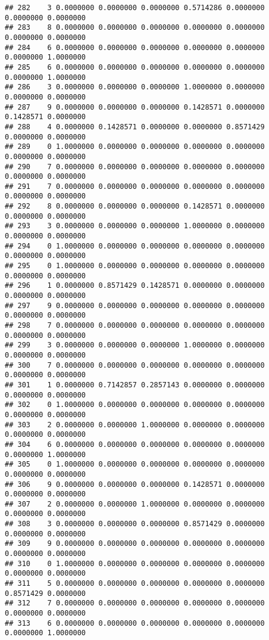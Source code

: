 \documentclass[
]{article}
\begin{document}
\begin{verbatim}
## 282    3 0.0000000 0.0000000 0.0000000 0.5714286 0.0000000 0.0000000 0.0000000
## 283    8 0.0000000 0.0000000 0.0000000 0.0000000 0.0000000 0.0000000 0.0000000
## 284    6 0.0000000 0.0000000 0.0000000 0.0000000 0.0000000 0.0000000 1.0000000
## 285    6 0.0000000 0.0000000 0.0000000 0.0000000 0.0000000 0.0000000 1.0000000
## 286    3 0.0000000 0.0000000 0.0000000 1.0000000 0.0000000 0.0000000 0.0000000
## 287    9 0.0000000 0.0000000 0.0000000 0.1428571 0.0000000 0.1428571 0.0000000
## 288    4 0.0000000 0.1428571 0.0000000 0.0000000 0.8571429 0.0000000 0.0000000
## 289    0 1.0000000 0.0000000 0.0000000 0.0000000 0.0000000 0.0000000 0.0000000
## 290    7 0.0000000 0.0000000 0.0000000 0.0000000 0.0000000 0.0000000 0.0000000
## 291    7 0.0000000 0.0000000 0.0000000 0.0000000 0.0000000 0.0000000 0.0000000
## 292    8 0.0000000 0.0000000 0.0000000 0.1428571 0.0000000 0.0000000 0.0000000
## 293    3 0.0000000 0.0000000 0.0000000 1.0000000 0.0000000 0.0000000 0.0000000
## 294    0 1.0000000 0.0000000 0.0000000 0.0000000 0.0000000 0.0000000 0.0000000
## 295    0 1.0000000 0.0000000 0.0000000 0.0000000 0.0000000 0.0000000 0.0000000
## 296    1 0.0000000 0.8571429 0.1428571 0.0000000 0.0000000 0.0000000 0.0000000
## 297    9 0.0000000 0.0000000 0.0000000 0.0000000 0.0000000 0.0000000 0.0000000
## 298    7 0.0000000 0.0000000 0.0000000 0.0000000 0.0000000 0.0000000 0.0000000
## 299    3 0.0000000 0.0000000 0.0000000 1.0000000 0.0000000 0.0000000 0.0000000
## 300    7 0.0000000 0.0000000 0.0000000 0.0000000 0.0000000 0.0000000 0.0000000
## 301    1 0.0000000 0.7142857 0.2857143 0.0000000 0.0000000 0.0000000 0.0000000
## 302    0 1.0000000 0.0000000 0.0000000 0.0000000 0.0000000 0.0000000 0.0000000
## 303    2 0.0000000 0.0000000 1.0000000 0.0000000 0.0000000 0.0000000 0.0000000
## 304    6 0.0000000 0.0000000 0.0000000 0.0000000 0.0000000 0.0000000 1.0000000
## 305    0 1.0000000 0.0000000 0.0000000 0.0000000 0.0000000 0.0000000 0.0000000
## 306    9 0.0000000 0.0000000 0.0000000 0.1428571 0.0000000 0.0000000 0.0000000
## 307    2 0.0000000 0.0000000 1.0000000 0.0000000 0.0000000 0.0000000 0.0000000
## 308    3 0.0000000 0.0000000 0.0000000 0.8571429 0.0000000 0.0000000 0.0000000
## 309    9 0.0000000 0.0000000 0.0000000 0.0000000 0.0000000 0.0000000 0.0000000
## 310    0 1.0000000 0.0000000 0.0000000 0.0000000 0.0000000 0.0000000 0.0000000
## 311    5 0.0000000 0.0000000 0.0000000 0.0000000 0.0000000 0.8571429 0.0000000
## 312    7 0.0000000 0.0000000 0.0000000 0.0000000 0.0000000 0.0000000 0.0000000
## 313    6 0.0000000 0.0000000 0.0000000 0.0000000 0.0000000 0.0000000 1.0000000

\end{verbatim}
\end{document}
